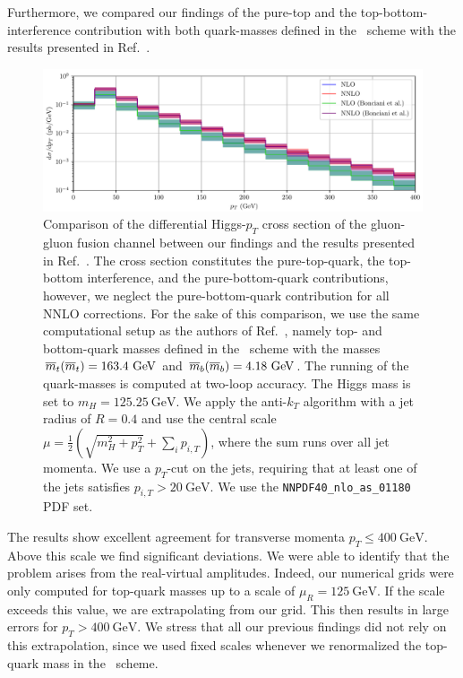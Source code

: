 Furthermore, we compared our findings of the pure-top and the top-bottom-interference contribution with both quark-masses defined in the \MS\ scheme with the results presented in Ref.~\cite{Bonciani:2022jmb}.
\begin{figure}[ht]
\centering
\includegraphics[width=\textwidth]{Images/pTBonciani.pdf}
\caption{Comparison of the differential Higgs-$p_T$ cross section of the gluon-gluon fusion channel between our findings and the results presented in Ref.~\cite{Bonciani:2022jmb}. The cross section constitutes the pure-top-quark, the top-bottom interference, and the pure-bottom-quark contributions, however, we neglect the pure-bottom-quark contribution for all \acs{NNLO} corrections. For the sake of this comparison, we use the same computational setup as the authors of Ref.~\cite{Bonciani:2022jmb}, namely top- and bottom-quark masses defined in the \MS\ scheme with the masses $\msMass{t} = 163.4\ \mathrm{GeV}$ and $\msMass{b} = 4.18\ \mathrm{GeV}$. The running of the quark-masses is computed at two-loop accuracy. The Higgs mass is set to $m_H = 125.25\ \mathrm{GeV}$. We apply the anti-$k_T$ algorithm with a jet radius of $R = 0.4$ and use the central scale $\mu = \frac{1}{2}\left( \sqrt{m_H^2 + p_T^2} + \sum_i p_{i, T} \right)$, where the sum runs over all jet momenta. We use a $p_T$-cut on the jets, requiring that at least one of the jets satisfies $p_{i,T} > 20 \ \mathrm{GeV}$. We use the \texttt{NNPDF40\_nlo\_as\_01180} \acs{PDF} set.}
\label{fig:6:bonciani_comparison}
\end{figure}
The results show excellent agreement for transverse momenta $p_T \le 400 \ \mathrm{GeV}$. Above this scale we find significant deviations. We were able to identify that the problem arises from the real-virtual amplitudes. Indeed, our numerical grids were only computed for top-quark masses up to a scale of $\mu_R = 125\ \mathrm{GeV}$. If the scale exceeds this value, we are extrapolating from our grid. This then results in large errors for $p_T > 400 \ \mathrm{GeV}$. We stress that all our previous findings did not rely on this extrapolation, since we used fixed scales whenever we renormalized the top-quark mass in the \MS\ scheme.

